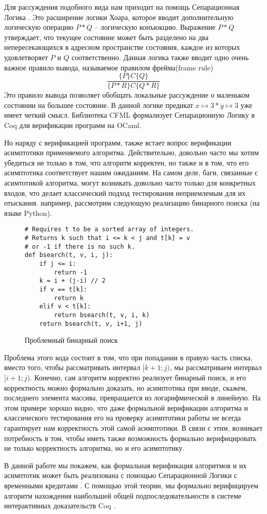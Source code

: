 \par
Для рассуждения подобного вида нам приходит на помощь Сепарационная Логика \cite{SepLogic}. Это расширение логики Хоара, которое
вводит дополнительную логическую операцию $P \ast Q$ -- логическую конъюкцию. Выражение $P \ast Q$ утверждает, что текущее состояние
может быть разделено на два непересекающихся в адресном пространстве состояния, каждое из которых удовлетворяет $P$ и $Q$ соответственно.
Данная логика также вводит одно очень важное правило вывода, называемое правилом фрейма(frame rule)
$$
    \frac{\{P\} C\{Q\}}{\{P * R\} C\{Q * R\}}
$$
Это правило вывода позволяет обобщать локальные рассуждение о маленьком состоянии на большее состояние. В данной логике предикат
$x \mapsto 3 \ast y \mapsto 3$ уже имеет четкий смысл. Библиотека CFML \cite{CFML} формализует Сепарационную Логику в Coq для верификации
программ на OCaml.
\par
Но наряду с верификацией программ, также встает вопрос верификации асимптотики применяемого алгоритма. Действительно, довольно часто
мы хотим убедиться не только в том, что алгоритм корректен, но также и в том, что его асимптотика соответствует нашим ожиданиям.
На самом деле, баги, связанные с асимтотикой алгоритма, могут возникать довольно часто только для конкретных входов, что делает
классический подход тестирования неприемлемым для их отыскания. например, рассмотрим следующую реализацию бинарного поиска
(на языке Python).
\pagebreak
\begin{figure}[H]
    \caption{Проблемный бинарный поиск}
    \label{code:bsearch}
    \begin{verbatim}
# Requires t to be a sorted array of integers.
# Returns k such that i <= k < j and t[k] = v
# or -1 if there is no such k.
def bsearch(t, v, i, j):
    if j <= i:
        return -1
    k = i + (j-i) // 2
    if v == t[k]:
        return k
    elif v < t[k]:
        return bsearch(t, v, i, k)
    return bsearch(t, v, i+1, j)
\end{verbatim}
\end{figure}
Проблема этого кода состоит в том, что при попадании в правую часть списка, вместо того, чтобы рассматривать интервал $[k+1;j)$, мы
рассматриваем интервал \\
$[i+1;j)$. Конечно, сам алгоритм корректно реализует бинарный поиск, и его корректность можно формально доказать, 
но асимптотика при вводе, скажем, последнего элемента массива, превращается из логарифмической в линейную. 
На этом примере хорошо видно, что даже формальной верификации алгоритма и классического тестирования его на проверку 
асимптотики работы не всегда гарантирует нам корректность этой самой асимптотики.
В связи с этим, возникает потребность в том, чтобы иметь также возможность формально верифицировать не только корректность алгоритма, но
и его асимптотику.
\par
В данной работе мы покажем, как формальная верификация алгоритмов и их асимптотик может быть реализована с помощью Сепарационной Логики
с временными кредитами \cite{base_article}. С помощью этой теории, мы формально верифицируем алгоритм нахождения наибольшей общей подпоследовательности
в системе интерактивных доказательств Coq \cite{the_coq_development_team_2021_4501022}.